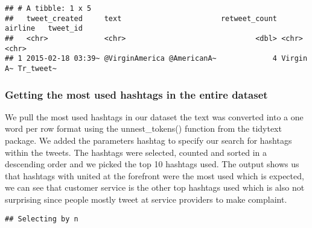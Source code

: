 \documentclass[
]{article}
\newenvironment{Shaded}{\begin{snugshade}}{\end{snugshade}}
\newcommand{\CommentTok}[1]{\textcolor[rgb]{0.56,0.35,0.01}{\textit{#1}}}
\newcommand{\DataTypeTok}[1]{\textcolor[rgb]{0.13,0.29,0.53}{#1}}
\newcommand{\DecValTok}[1]{\textcolor[rgb]{0.00,0.00,0.81}{#1}}
\newcommand{\KeywordTok}[1]{\textcolor[rgb]{0.13,0.29,0.53}{\textbf{#1}}}
\newcommand{\NormalTok}[1]{#1}
\newcommand{\OperatorTok}[1]{\textcolor[rgb]{0.81,0.36,0.00}{\textbf{#1}}}
\newcommand{\OtherTok}[1]{\textcolor[rgb]{0.56,0.35,0.01}{#1}}
\newcommand{\StringTok}[1]{\textcolor[rgb]{0.31,0.60,0.02}{#1}}
\begin{document}
\begin{verbatim}
## # A tibble: 1 x 5
##   tweet_created     text                       retweet_count airline   tweet_id 
##   <chr>             <chr>                              <dbl> <chr>     <chr>    
## 1 2015-02-18 03:39~ @VirginAmerica @AmericanA~             4 Virgin A~ Tr_tweet~
\end{verbatim}

\hypertarget{getting-the-most-used-hashtags-in-the-entire-dataset}{%
\subsubsection{Getting the most used hashtags in the entire
dataset}\label{getting-the-most-used-hashtags-in-the-entire-dataset}}

We pull the most used hashtags in our dataset the text was converted
into a one word per row format using the unnest\_tokens() function from
the tidytext package. We added the parameters hashtag to specify our
search for hashtags within the tweets. The hashtags were selected,
counted and sorted in a descending order and we picked the top 10
hashtags used. The output shows us that hashtags with united at the
forefront were the most used which is expected, we can see that customer
service is the other top hashtags used which is also not surprising
since people mostly tweet at service providers to make complaint.

\begin{Shaded}
\end{Shaded}

\begin{verbatim}
## Selecting by n
\end{verbatim}
\end{document}
